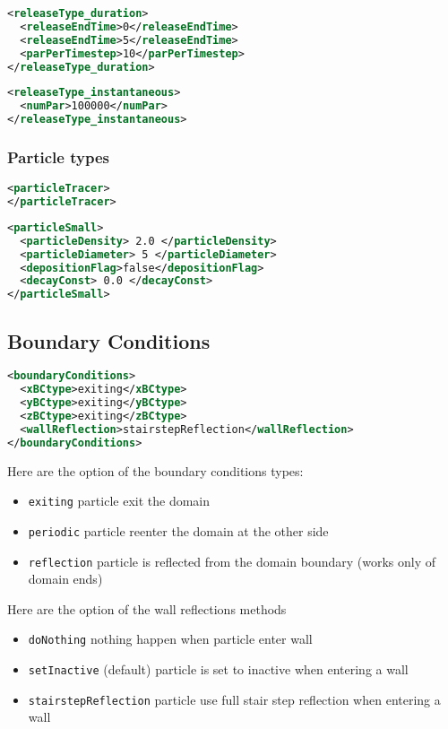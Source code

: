 \begin{lstlisting}[language=XML]
<releaseType_duration>
  <releaseEndTime>0</releaseEndTime>
  <releaseEndTime>5</releaseEndTime>
  <parPerTimestep>10</parPerTimestep>
</releaseType_duration>
\end{lstlisting}

\begin{lstlisting}[language=XML]
<releaseType_instantaneous>
  <numPar>100000</numPar>
</releaseType_instantaneous>
\end{lstlisting}

\subsubsection{Particle types}

\begin{lstlisting}[language=XML]
<particleTracer>
</particleTracer>
\end{lstlisting}

\begin{lstlisting}[language=XML]
<particleSmall>
  <particleDensity> 2.0 </particleDensity>
  <particleDiameter> 5 </particleDiameter>
  <depositionFlag>false</depositionFlag>
  <decayConst> 0.0 </decayConst>
</particleSmall>
\end{lstlisting}


\subsection{Boundary Conditions}
\begin{lstlisting}[language=XML]
<boundaryConditions>
  <xBCtype>exiting</xBCtype>
  <yBCtype>exiting</yBCtype>
  <zBCtype>exiting</zBCtype>
  <wallReflection>stairstepReflection</wallReflection>
</boundaryConditions>
\end{lstlisting}

\noindent Here are the option of the boundary conditions types:
\begin{itemize}
    \item \texttt{exiting} particle exit the domain
    \item \texttt{periodic} particle reenter the domain at the other side
    \item \texttt{reflection} particle is reflected from the domain boundary (works only of domain ends)
\end{itemize}

\noindent Here are the option of the wall reflections methods
\begin{itemize}
    \item \texttt{doNothing} nothing happen when particle enter wall
    \item \texttt{setInactive} (default) particle is set to inactive when entering a wall
    \item \texttt{stairstepReflection} particle use full stair step reflection when entering a wall
\end{itemize}



